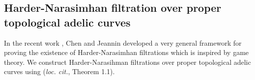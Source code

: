 \documentclass [11pt,reqno]{amsart}
\newcommand{\1}{\mathmybb{1}}
\begin{document}

\subsection{Harder-Narasimhan filtration over proper topological adelic curves}
\label{sub:HN_general}

In the recent work \cite{ChenJeannin23}, Chen and Jeannin developed a very general framework for proving the existence of Harder-Narasimhan filtrations which is inspired by game theory. We construct Harder-Narasihman filtrations over proper topological adelic curves using (\emph{loc. cit.}, Theorem 1.1).
\end{document}
